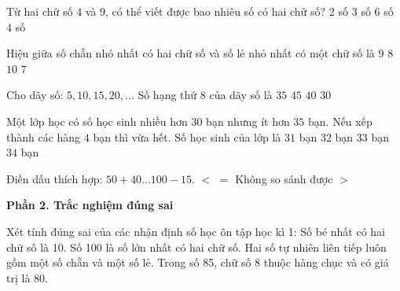 \begin{ex} %
Từ hai chữ số $4$ và $9$, có thể viết được bao nhiêu số có hai chữ số?
\choice
{$2$ số}
{$3$ số}
{$6$ số}
{\True $4$ số}
\end{ex}

\begin{ex} %
Hiệu giữa số chẵn nhỏ nhất có hai chữ số và số lẻ nhỏ nhất có một chữ số là
\choice
{\True $9$}
{$8$}
{$10$}
{$7$}
\end{ex}

\begin{ex} %
Cho dãy số: $5, 10, 15, 20, \dots$ Số hạng thứ $8$ của dãy số là
\choice
{$35$}
{$45$}
{\True $40$}
{$30$}
\end{ex}

\begin{ex} %
Một lớp học có số học sinh nhiều hơn $30$ bạn nhưng ít hơn $35$ bạn. Nếu xếp thành các hàng $4$ bạn thì vừa hết. Số học sinh của lớp là
\choice
{$31$ bạn}
{\True $32$ bạn}
{$33$ bạn}
{$34$ bạn}
\end{ex}

\begin{ex} %
Điền dấu thích hợp: $50 + 40 \dots 100 - 15$.
\choice
{$<$}
{$=$}
{Không so sánh được}
{\True $>$}
\end{ex}

\textbf{Phần 2. Trắc nghiệm đúng sai}

\begin{ex} %
Xét tính đúng sai của các nhận định số học ôn tập học kì 1:
\choiceTF
{\True Số bé nhất có hai chữ số là 10.}
{Số 100 là số lớn nhất có hai chữ số.}
{\True Hai số tự nhiên liên tiếp luôn gồm một số chẵn và một số lẻ.}
{\True Trong số 85, chữ số 8 thuộc hàng chục và có giá trị là 80.}
\end{ex}

